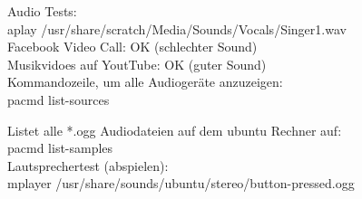 Audio Tests:\\
aplay /usr/share/scratch/Media/Sounds/Vocals/Singer1.wav\\
Facebook Video Call: OK (schlechter Sound)\\
Musikvidoes auf YoutTube: OK (guter Sound)\\

Kommandozeile, um alle Audiogeräte anzuzeigen:\\
pacmd list-sources

Listet alle *.ogg Audiodateien auf dem ubuntu Rechner auf:\\
pacmd list-samples\\
Lautsprechertest (abspielen):\\
mplayer /usr/share/sounds/ubuntu/stereo/button-pressed.ogg 

